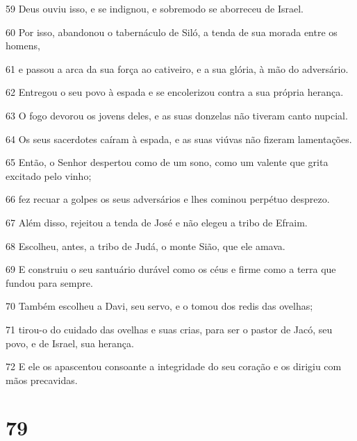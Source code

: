 \par 59 Deus ouviu isso, e se indignou, e sobremodo se aborreceu de Israel.
\par 60 Por isso, abandonou o tabernáculo de Siló, a tenda de sua morada entre os homens,
\par 61 e passou a arca da sua força ao cativeiro, e a sua glória, à mão do adversário.
\par 62 Entregou o seu povo à espada e se encolerizou contra a sua própria herança.
\par 63 O fogo devorou os jovens deles, e as suas donzelas não tiveram canto nupcial.
\par 64 Os seus sacerdotes caíram à espada, e as suas viúvas não fizeram lamentações.
\par 65 Então, o Senhor despertou como de um sono, como um valente que grita excitado pelo vinho;
\par 66 fez recuar a golpes os seus adversários e lhes cominou perpétuo desprezo.
\par 67 Além disso, rejeitou a tenda de José e não elegeu a tribo de Efraim.
\par 68 Escolheu, antes, a tribo de Judá, o monte Sião, que ele amava.
\par 69 E construiu o seu santuário durável como os céus e firme como a terra que fundou para sempre.
\par 70 Também escolheu a Davi, seu servo, e o tomou dos redis das ovelhas;
\par 71 tirou-o do cuidado das ovelhas e suas crias, para ser o pastor de Jacó, seu povo, e de Israel, sua herança.
\par 72 E ele os apascentou consoante a integridade do seu coração e os dirigiu com mãos precavidas.

\chapter{79}

